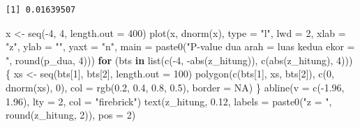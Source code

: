 \documentclass[
  indonesian,
  letterpaper,
]{book}
\newenvironment{Shaded}{\begin{snugshade}}{\end{snugshade}}
\newcommand{\AttributeTok}[1]{\textcolor[rgb]{0.40,0.45,0.13}{#1}}
\newcommand{\ConstantTok}[1]{\textcolor[rgb]{0.56,0.35,0.01}{#1}}
\newcommand{\ControlFlowTok}[1]{\textcolor[rgb]{0.00,0.23,0.31}{\textbf{#1}}}
\newcommand{\DecValTok}[1]{\textcolor[rgb]{0.68,0.00,0.00}{#1}}
\newcommand{\FloatTok}[1]{\textcolor[rgb]{0.68,0.00,0.00}{#1}}
\newcommand{\FunctionTok}[1]{\textcolor[rgb]{0.28,0.35,0.67}{#1}}
\newcommand{\NormalTok}[1]{\textcolor[rgb]{0.00,0.23,0.31}{#1}}
\newcommand{\OtherTok}[1]{\textcolor[rgb]{0.00,0.23,0.31}{#1}}
\newcommand{\SpecialCharTok}[1]{\textcolor[rgb]{0.37,0.37,0.37}{#1}}
\newcommand{\StringTok}[1]{\textcolor[rgb]{0.13,0.47,0.30}{#1}}
\begin{document}
\begin{verbatim}
[1] 0.01639507
\end{verbatim}

\begin{Shaded}
\begin{Highlighting}[]
\NormalTok{x }\OtherTok{\textless{}{-}} \FunctionTok{seq}\NormalTok{(}\SpecialCharTok{{-}}\DecValTok{4}\NormalTok{, }\DecValTok{4}\NormalTok{, }\AttributeTok{length.out =} \DecValTok{400}\NormalTok{)}
\FunctionTok{plot}\NormalTok{(x, }\FunctionTok{dnorm}\NormalTok{(x), }\AttributeTok{type =} \StringTok{"l"}\NormalTok{, }\AttributeTok{lwd =} \DecValTok{2}\NormalTok{, }\AttributeTok{xlab =} \StringTok{"z"}\NormalTok{, }\AttributeTok{ylab =} \StringTok{""}\NormalTok{, }\AttributeTok{yaxt =} \StringTok{"n"}\NormalTok{,}
     \AttributeTok{main =} \FunctionTok{paste0}\NormalTok{(}\StringTok{"P{-}value dua arah = luas kedua ekor = "}\NormalTok{, }\FunctionTok{round}\NormalTok{(p\_dua, }\DecValTok{4}\NormalTok{)))}
\ControlFlowTok{for}\NormalTok{ (bts }\ControlFlowTok{in} \FunctionTok{list}\NormalTok{(}\FunctionTok{c}\NormalTok{(}\SpecialCharTok{{-}}\DecValTok{4}\NormalTok{, }\SpecialCharTok{{-}}\FunctionTok{abs}\NormalTok{(z\_hitung)), }\FunctionTok{c}\NormalTok{(}\FunctionTok{abs}\NormalTok{(z\_hitung), }\DecValTok{4}\NormalTok{))) \{}
\NormalTok{  xs }\OtherTok{\textless{}{-}} \FunctionTok{seq}\NormalTok{(bts[}\DecValTok{1}\NormalTok{], bts[}\DecValTok{2}\NormalTok{], }\AttributeTok{length.out =} \DecValTok{100}\NormalTok{)}
  \FunctionTok{polygon}\NormalTok{(}\FunctionTok{c}\NormalTok{(bts[}\DecValTok{1}\NormalTok{], xs, bts[}\DecValTok{2}\NormalTok{]), }\FunctionTok{c}\NormalTok{(}\DecValTok{0}\NormalTok{, }\FunctionTok{dnorm}\NormalTok{(xs), }\DecValTok{0}\NormalTok{), }\AttributeTok{col =} \FunctionTok{rgb}\NormalTok{(}\FloatTok{0.2}\NormalTok{, }\FloatTok{0.4}\NormalTok{, }\FloatTok{0.8}\NormalTok{, }\FloatTok{0.5}\NormalTok{), }\AttributeTok{border =} \ConstantTok{NA}\NormalTok{)}
\NormalTok{\}}
\FunctionTok{abline}\NormalTok{(}\AttributeTok{v =} \FunctionTok{c}\NormalTok{(}\SpecialCharTok{{-}}\FloatTok{1.96}\NormalTok{, }\FloatTok{1.96}\NormalTok{), }\AttributeTok{lty =} \DecValTok{2}\NormalTok{, }\AttributeTok{col =} \StringTok{"firebrick"}\NormalTok{)}
\FunctionTok{text}\NormalTok{(z\_hitung, }\FloatTok{0.12}\NormalTok{, }\AttributeTok{labels =} \FunctionTok{paste0}\NormalTok{(}\StringTok{"z = "}\NormalTok{, }\FunctionTok{round}\NormalTok{(z\_hitung, }\DecValTok{2}\NormalTok{)), }\AttributeTok{pos =} \DecValTok{2}\NormalTok{)}
\end{Highlighting}
\end{Shaded}
\end{document}
